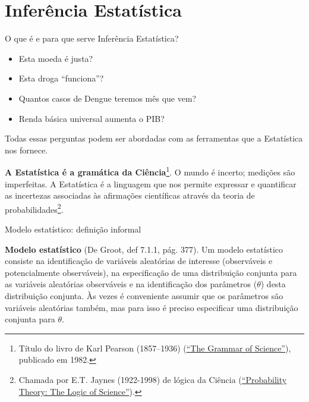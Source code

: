\section*{Inferência Estatística}
\begin{frame}{O que é e para que serve Inferência Estatística?}

\begin{itemize}
 \item[\faQuestion] Esta moeda é justa?
 \item[\faQuestion] Esta droga ``funciona''?
 \item[\faQuestion] Quantos casos de Dengue teremos mês que vem?
 \item[\faQuestion] Renda básica universal aumenta o PIB?
\end{itemize}

Todas essas perguntas podem ser abordadas com as ferramentas que a Estatística nos fornece.

\begin{ideia}
\textbf{A Estatística é a gramática da Ciência}\footnote{Título do livro de Karl Pearson (1857--1936) (\href{https://en.wikipedia.org/wiki/The_Grammar_of_Science}{``The Grammar of Science''}), publicado em 1982.}.
O mundo é incerto; medições são imperfeitas.
A Estatística é a linguagem que nos permite expressar e quantificar as incertezas associadas às afirmações científicas através da teoria de probabilidades\footnote{Chamada por E.T. Jaynes (1922-1998) de lógica da Ciência (\href{https://www.cambridge.org/gb/academic/subjects/physics/theoretical-physics-and-mathematical-physics/probability-theory-logic-science}{``Probability Theory: The Logic of Science''}).}.
\end{ideia}
\end{frame}
\begin{frame}{Modelo estatístico: definição informal}
\begin{defn}
  \textbf{Modelo estatístico} (De Groot, def 7.1.1, pág. 377).  
Um modelo estatístico consiste na identificação de variáveis aleatórias de interesse (observáveis e potencialmente observáveis), na especificação de uma distribuição conjunta para as variáveis aleatórias observáveis e na identificação dos parâmetros ($\theta$) desta distribuição conjunta.
Às vezes é conveniente assumir que os parâmetros são variáveis aleatórias também, mas para isso é preciso especificar uma distribuição conjunta para $\theta$.
\end{defn}
 
\end{frame}
